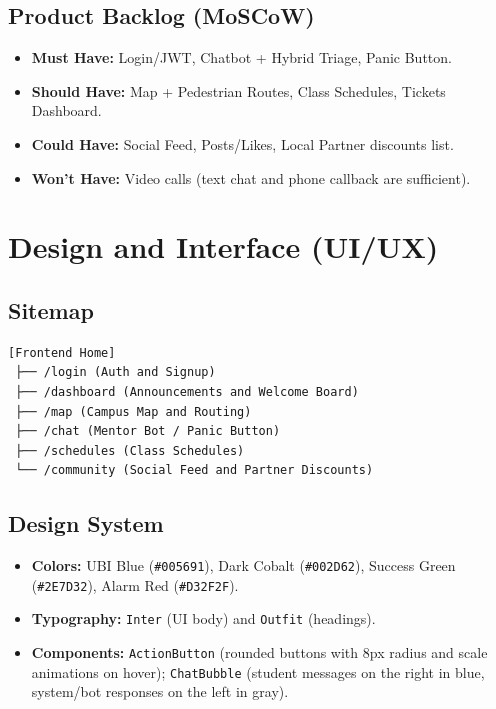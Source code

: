\subsection{Product Backlog (MoSCoW)}
\begin{itemize}
    \item \textbf{Must Have:} Login/\ac{JWT}, Chatbot + Hybrid Triage, Panic Button.
    \item \textbf{Should Have:} Map + Pedestrian Routes, Class Schedules, Tickets Dashboard.
    \item \textbf{Could Have:} Social Feed, Posts/Likes, Local Partner discounts list.
    \item \textbf{Won't Have:} Video calls (text chat and phone callback are sufficient).
\end{itemize}

\newpage

\section{Design and Interface (\ac{UI}/\ac{UX})}

\subsection{Sitemap}
\begin{verbatim}
[Frontend Home]
 ├── /login (Auth and Signup)
 ├── /dashboard (Announcements and Welcome Board)
 ├── /map (Campus Map and Routing)
 ├── /chat (Mentor Bot / Panic Button)
 ├── /schedules (Class Schedules)
 └── /community (Social Feed and Partner Discounts)
\end{verbatim}

\subsection{Design System}
\begin{itemize}
    \item \textbf{Colors:} \ac{UBI} Blue (\texttt{\#005691}), Dark Cobalt (\texttt{\#002D62}), Success Green (\texttt{\#2E7D32}), Alarm Red (\texttt{\#D32F2F}).
    \item \textbf{Typography:} \texttt{Inter} (\ac{UI} body) and \texttt{Outfit} (headings).
    \item \textbf{Components:} \texttt{ActionButton} (rounded buttons with 8px radius and scale animations on hover); \texttt{ChatBubble} (student messages on the right in blue, system/bot responses on the left in gray).
\end{itemize}

